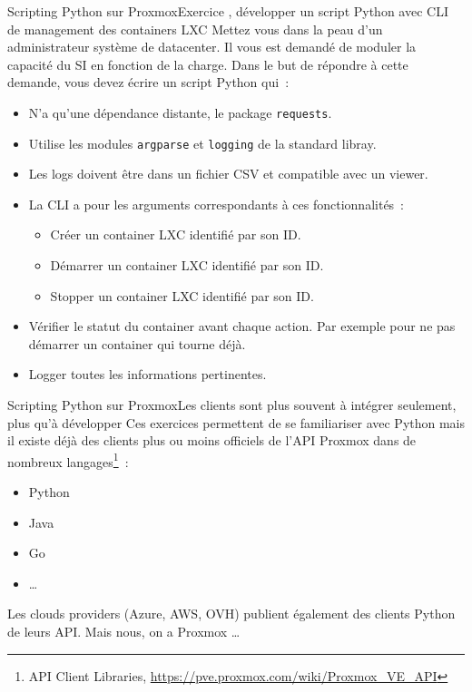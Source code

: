 \documentclass{beamer}
\begin{document}
    \begin{frame}{Scripting Python sur Proxmox}{Exercice \execcounterdispinc{}, développer un script Python avec CLI de management des containers LXC}
        Mettez vous dans la peau d'un administrateur système de datacenter.
        Il vous est demandé de moduler la capacité du SI en fonction de la charge.
        Dans le but de répondre à cette demande, vous devez écrire un script Python qui~:
        \begin{itemize}
            \item N'a qu'une dépendance distante, le package \lstinline{requests}.
            \item Utilise les modules \lstinline{argparse} et \lstinline{logging} de la standard libray.
            \item Les logs doivent être dans un fichier CSV et compatible avec un viewer.
            \item La CLI a pour les arguments correspondants à ces fonctionnalités~:
            \begin{itemize}
                \item Créer un container LXC identifié par son ID.
                \item Démarrer un container LXC identifié par son ID.
                \item Stopper un container LXC identifié par son ID.
            \end{itemize}
            \item Vérifier le statut du container avant chaque action.
            Par exemple pour ne pas démarrer un container qui tourne déjà.
            \item Logger toutes les informations pertinentes.
        \end{itemize}
    \end{frame}

    \begin{frame}{Scripting Python sur Proxmox}{Les clients sont plus souvent à intégrer seulement, plus qu'à développer}
        Ces exercices permettent de se familiariser avec Python mais il existe déjà des clients plus ou moins officiels de l'API Proxmox dans de nombreux langages\footnote{API Client Libraries, \url{https://pve.proxmox.com/wiki/Proxmox_VE_API}}~:
        \begin{itemize}
            \item Python
            \item Java
            \item Go
            \item \ldots
        \end{itemize}
        \bigbreak
        Les clouds providers (Azure, AWS, OVH) publient également des clients Python de leurs API.
        Mais nous, on a Proxmox \ldots
    \end{frame}
\end{document}
